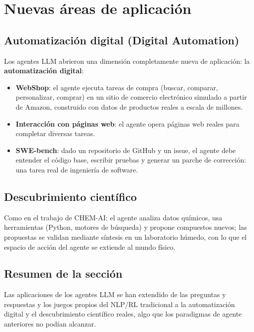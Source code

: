 \section{Nuevas áreas de aplicación}

\subsection{Automatización digital (Digital Automation)}

Los agentes LLM abrieron una dimensión completamente nueva de aplicación: la \textbf{automatización digital}:

\begin{itemize}
    \item \textbf{WebShop}: el agente ejecuta tareas de compra (buscar, comparar, personalizar, comprar) en un sitio de comercio electrónico simulado a partir de Amazon, construido con datos de productos reales a escala de millones.
    \item \textbf{Interacción con páginas web}: el agente opera páginas web reales para completar diversas tareas.
    \item \textbf{SWE-bench}: dado un repositorio de GitHub y un issue, el agente debe entender el código base, escribir pruebas y generar un parche de corrección: una tarea real de ingeniería de software.
\end{itemize}

\subsection{Descubrimiento científico}

Como en el trabajo de CHEM-AI: el agente analiza datos químicos, usa herramientas (Python, motores de búsqueda) y propone compuestos nuevos; las propuestas se validan mediante síntesis en un laboratorio húmedo, con lo que el espacio de acción del agente se extiende al mundo físico.

\subsection{Resumen de la sección}

Las aplicaciones de los agentes LLM se han extendido de las preguntas y respuestas y los juegos propios del NLP/RL tradicional a la automatización digital y el descubrimiento científico reales, algo que los paradigmas de agente anteriores no podían alcanzar.
